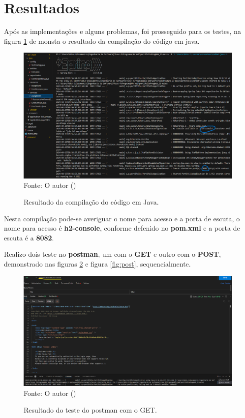 \section{Resultados}
\par Após as implementações e alguns problemas, foi prosseguido para os testes, na figura \ref{fig:com} de monsta o resultado da compilação do código em java.

\begin{figure}[H]
\center
  \caption{Resultado da compilação do código em Java.}
  \includegraphics[width=\textwidth]{figure/resultado da compilação.png}
  \label{fig:com}
  \flushleft %
    {\fontsize{10pt}{\baselineskip}\selectfont
    Fonte: O autor (\the\year) }
\end{figure}

\par Nesta compilação pode-se averiguar o nome para acesso e a porta de escuta, o nome para acesso é \textbf{h2-console}, conforme defenido no \textbf{pom.xml} e a porta de escuta é a \textbf{8082}.

\par Realizo dois teste no \textbf{postman}, um com o \textbf{GET} e outro com o \textbf{POST}, demonstrado nas figuras \ref{fig:get} e figura \ref{fig:post}, sequencialmente.

\begin{figure}[H]
\center
  \caption{Resultado do teste do postman com o GET.}
  \includegraphics[width=\textwidth]{figure/postman_GET.png}
  \label{fig:get}
  \flushleft %
    {\fontsize{10pt}{\baselineskip}\selectfont
    Fonte: O autor (\the\year) }
\end{figure}

